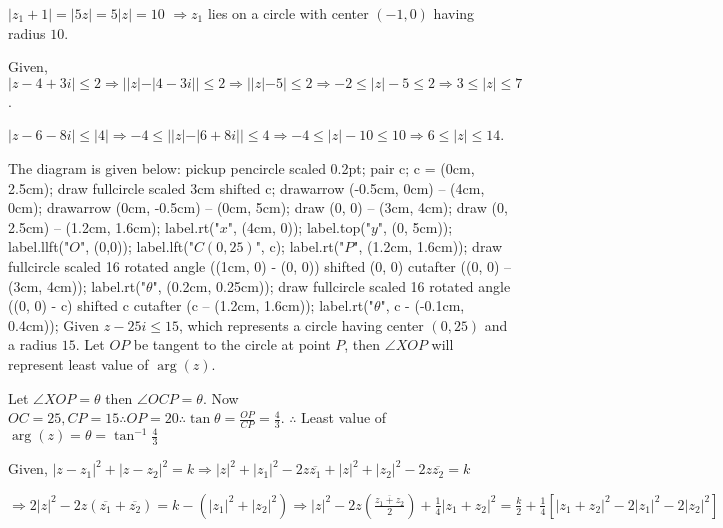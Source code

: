   $|z_1 + 1| = |5z| = 5|z| = 10$
  $\Rightarrow z_1$ lies on a circle with center $(-1, 0)$ having radius $10$.
\item Given, $|z - 4 + 3i|\leq 2 \Rightarrow ||z| - |4 - 3i||\leq 2\Rightarrow ||z| - 5|\leq 2 \Rightarrow
  -2 \leq |z| - 5\leq 2 \Rightarrow 3\leq |z|\leq 7$.
\item $|z - 6 - 8i|\leq |4| \Rightarrow -4 \leq ||z| - |6 + 8i|| \leq 4\Rightarrow -4 \leq |z| - 10 \leq 10
  \Rightarrow 6\leq |z|\leq 14$.
\item The diagram is given below:
  \startplacefigure[location={left,none}]
    \startMPcode
      pickup pencircle scaled 0.2pt;
      pair c;
      c = (0cm, 2.5cm);
      draw fullcircle scaled 3cm shifted c;
      drawarrow (-0.5cm, 0cm) -- (4cm, 0cm);
      drawarrow (0cm, -0.5cm) -- (0cm, 5cm);
      draw (0, 0) -- (3cm, 4cm);
      draw (0, 2.5cm) -- (1.2cm, 1.6cm);
      label.rt("$x$", (4cm, 0));
      label.top("$y$", (0, 5cm));
      label.llft("$O$", (0,0));
      label.lft("$C(0, 25)$", c);
      label.rt("$P$", (1.2cm, 1.6cm));
      draw fullcircle scaled 16 rotated angle ((1cm, 0) - (0, 0)) shifted (0, 0) cutafter ((0, 0) -- (3cm, 4cm));
      label.rt("$\theta$", (0.2cm, 0.25cm));
      draw fullcircle scaled 16 rotated angle ((0, 0) - c) shifted c cutafter (c -- (1.2cm, 1.6cm));
      label.rt("$\theta$", c - (-0.1cm, 0.4cm));
    \stopMPcode
  \stopplacefigure
  Given $z - 25i \leq 15$, which represents a circle having center $(0, 25)$ and a radius $15$.
  Let $OP$ be tangent to the circle at point $P$, then $\angle XOP$ will represent least
  value of $\arg(z)$.

  Let $\angle XOP = \theta$ then $\angle OCP = \theta$. Now $OC = 25, CP = 15 \therefore OP = 20\therefore
  \tan\theta = \frac{OP}{CP} = \frac{4}{3}$. $\therefore$ Least value of $\arg(z) = \theta =
  \tan^{-1}\frac{4}{3}$
  \vskip 2.4cm
\item Given, $|z - z_1|^2 + |z - z_2|^2 = k\Rightarrow |z|^2 + |z_1|^2 - 2z\overline{z_1} + |z|^2 + |z_2|^2
  - 2z\overline{z_2} = k$

  $\Rightarrow 2|z|^2 - 2z(\overline{z_1} + \overline{z_2}) = k - (|z_1|^2 + |z_2|^2)\Rightarrow |z|^2 -
  2z\left(\frac{\overline{z_1 + z_2}}{2}\right) + \frac{1}{4}|z_1 + z_2|^2 = \frac{k}{2} + \frac{1}{4}[|z_1
    + z_2|^2 - 2|z_1|^2 -2|z_2|^2]$


